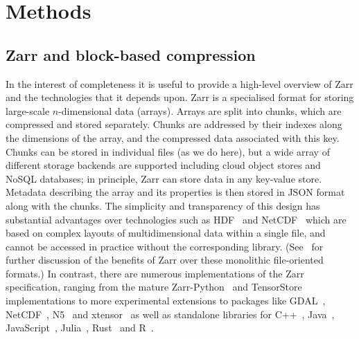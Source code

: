 \documentclass[a4paper,num-refs]{oup-contemporary}
\begin{document}
\section{Methods}

\subsection{Zarr and block-based compression}
In the interest of completeness it is useful to provide a high-level overview
of Zarr and the technologies that it depends upon. Zarr is a specialised format
for storing large-scale $n$-dimensional data (arrays). Arrays
are split into chunks, which are compressed and stored separately. Chunks are
addressed by their indexes along the dimensions of the array, and the
compressed data associated with this key. Chunks can
be stored in individual files (as we do here), but a wide array of different
storage backends are supported including cloud object stores
and NoSQL databases;
in principle, Zarr can store data in any key-value store.
Metadata describing the array and its properties is then stored
in JSON format along with the chunks.
The simplicity and transparency
of this design has substantial advantages over technologies
such as HDF~\citep{folk2011overview} and
NetCDF~\citep{rew1990netcdf} which are based on complex
layouts of multidimensional data within a single file,
and cannot be accessed in practice without the corresponding library.
(See~\cite{abernathey2021cloud} for further discussion of the benefits
of Zarr over these monolithic file-oriented formats.)
In contrast, there are numerous implementations
of the Zarr specification, ranging
from the mature Zarr-Python~\citep{zarrpython}
and TensorStore~\citep{tensorstore} implementations
to more experimental extensions to packages like
GDAL~\citep{gdal_zarr},
NetCDF~\citep{netcfd_c},
N5~\citep{n5zarr}
and xtensor~\citep{xtensor_zarr}
as well as  standalone libraries for
C++~\citep{ruan2024image},
Java~\cite{jzarr},
JavaScript~\cite{zarrjs},
Julia~\cite{zarrjl}, Rust~\citep{zarrs}
and R~\cite{pizzarr}.
\end{document}
